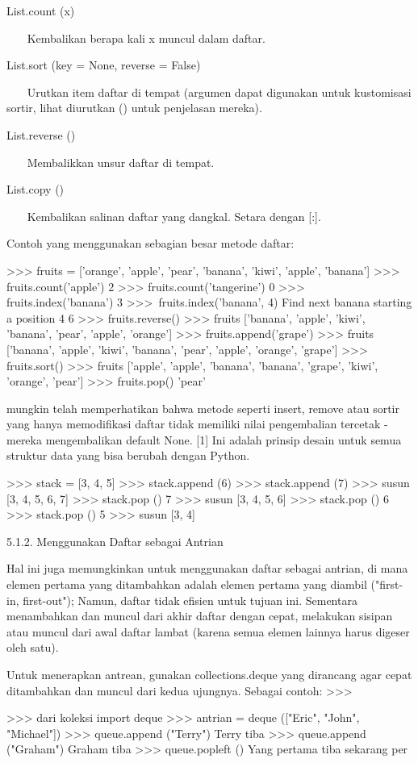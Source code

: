List.count (x) 

~~~ Kembalikan berapa kali x muncul dalam daftar. 

List.sort (key = None, reverse = False) 

~~~ Urutkan item daftar di tempat (argumen dapat digunakan untuk kustomisasi sortir, lihat diurutkan () untuk penjelasan mereka). 

List.reverse () 

~~~ Membalikkan unsur daftar di tempat. 

List.copy () 

~~~ Kembalikan salinan daftar yang dangkal. Setara dengan [:]. 

Contoh yang menggunakan sebagian besar metode daftar: 

>>> fruits = ['orange', 'apple', 'pear', 'banana', 'kiwi', 'apple', 'banana'] 
>>> fruits.count('apple') 
2 
>>> fruits.count('tangerine') 
0 
>>> fruits.index('banana') 
3 
>>>~fruits.index('banana', 4)        Find next banana starting a position 4 
6 
>>> fruits.reverse() 
>>> fruits 
['banana', 'apple', 'kiwi', 'banana', 'pear', 'apple', 'orange'] 
>>> fruits.append('grape') 
>>> fruits 
['banana', 'apple', 'kiwi', 'banana', 'pear', 'apple', 'orange', 'grape'] 
>>> fruits.sort() 
>>> fruits 
['apple', 'apple', 'banana', 'banana', 'grape', 'kiwi', 'orange', 'pear'] 
>>> fruits.pop() 
'pear' 

mungkin telah memperhatikan bahwa metode seperti insert, remove atau sortir yang hanya memodifikasi daftar tidak memiliki nilai pengembalian tercetak - mereka mengembalikan default None. [1] Ini adalah prinsip desain untuk semua struktur data yang bisa berubah dengan Python. 

>>> stack = [3, 4, 5] 
>>> stack.append (6) 
>>> stack.append (7) 
>>> susun 
[3, 4, 5, 6, 7] 
>>> stack.pop () 
7 
>>> susun 
[3, 4, 5, 6] 
>>> stack.pop () 
6 
>>> stack.pop () 
5 
>>> susun 
[3, 4] 

5.1.2. Menggunakan Daftar sebagai Antrian 

Hal ini juga memungkinkan untuk menggunakan daftar sebagai antrian, di mana elemen pertama yang ditambahkan adalah elemen pertama yang diambil ("first-in, first-out"); Namun, daftar tidak efisien untuk tujuan ini. Sementara menambahkan dan muncul dari akhir daftar dengan cepat, melakukan sisipan atau muncul dari awal daftar lambat (karena semua elemen lainnya harus digeser oleh satu). 

Untuk menerapkan antrean, gunakan collections.deque yang dirancang agar cepat ditambahkan dan muncul dari kedua ujungnya. Sebagai contoh: 
>>> 

>>> dari koleksi import deque 
>>> antrian = deque (["Eric", "John", "Michael"]) 
>>> queue.append ("Terry")       Terry tiba 
>>> queue.append ("Graham")       Graham tiba 
>>> queue.popleft ()       Yang pertama tiba sekarang per
